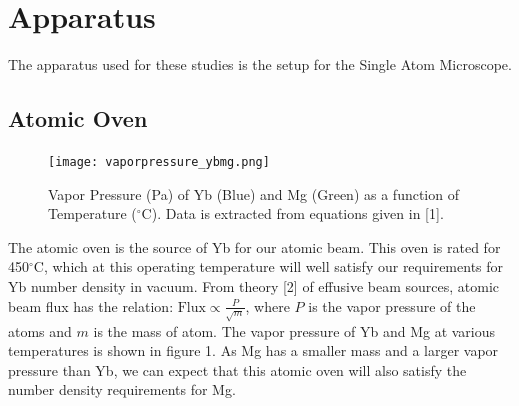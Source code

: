 \documentclass[12pt, a4paper]{article}
\begin{document}
\section{Apparatus}
The apparatus used for these studies is the setup for the Single Atom Microscope. 
\subsection{Atomic Oven}
\begin{figure}
\vspace*{-8mm}
  \texttt{[image: vaporpressure\_ybmg.png]}
  \vspace*{-5mm}
  \caption{Vapor Pressure (Pa) of Yb (Blue) and Mg (Green) as a function of Temperature ($^{\circ}$C). Data is extracted from equations given in [1].}
\end{figure}
The atomic oven is the source of Yb for our atomic beam. This oven is rated for 450$^{\circ}$C, which at this operating temperature will well satisfy our requirements for Yb number density in vacuum. From theory [2] of effusive beam sources,  atomic beam flux has the relation: $\mathrm{Flux} \propto \frac{P}{\sqrt{m}}$, where $P$ is the vapor pressure of the atoms and $m$ is the mass of atom. The vapor pressure of Yb and Mg at various temperatures is shown in figure 1. As Mg has a smaller mass and a larger vapor pressure than Yb, we can expect that this atomic oven will also satisfy the number density requirements for Mg. 
\end{document}
